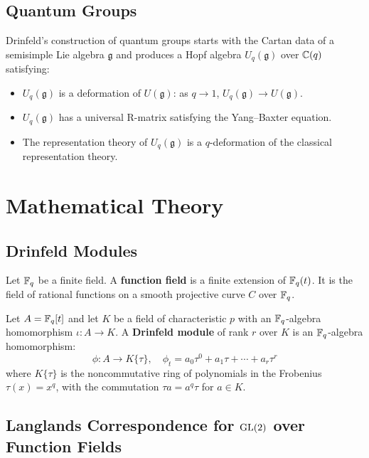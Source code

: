 \subsection{Quantum Groups}

Drinfeld's construction of quantum groups starts with the Cartan data of a semisimple Lie algebra $\mathfrak{g}$ and produces a Hopf algebra $U_q(\mathfrak{g})$ over $\mathbb{C}(q)$ satisfying:
\begin{itemize}
    \item $U_q(\mathfrak{g})$ is a deformation of $U(\mathfrak{g})$: as $q \to 1$, $U_q(\mathfrak{g}) \to U(\mathfrak{g})$.
    \item $U_q(\mathfrak{g})$ has a universal R-matrix satisfying the Yang--Baxter equation.
    \item The representation theory of $U_q(\mathfrak{g})$ is a $q$-deformation of the classical representation theory.
\end{itemize}

\section{Mathematical Theory}

\subsection{Drinfeld Modules}

\begin{definition}
Let $\mathbb{F}_q$ be a finite field. A \textbf{function field} is a finite extension of $\mathbb{F}_q(t)$. It is the field of rational functions on a smooth projective curve $C$ over $\mathbb{F}_q$.
\end{definition}

\begin{definition}
Let $A = \mathbb{F}_q[t]$ and let $K$ be a field of characteristic $p$ with an $\mathbb{F}_q$-algebra homomorphism $\iota: A \to K$. A \textbf{Drinfeld module} of rank $r$ over $K$ is an $\mathbb{F}_q$-algebra homomorphism:
\[
\phi: A \to K\{\tau\}, \quad \phi_t = a_0 \tau^0 + a_1 \tau + \cdots + a_r \tau^r
\]
where $K\{\tau\}$ is the noncommutative ring of polynomials in the Frobenius $\tau(x) = x^q$, with the commutation $\tau a = a^q \tau$ for $a \in K$.
\end{definition}

\subsection{Langlands Correspondence for \texorpdfstring{$\operatorname{GL}(2)$}{GL(2)} over Function Fields}

